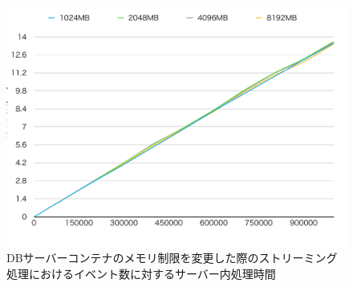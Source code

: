 \documentclass[../../../../../main]{subfiles}
\begin{document}
    \begin{figure}[H]
        \centering
        \includegraphics[width=12cm]{graph}
        \caption{DBサーバーコンテナのメモリ制限を変更した際のストリーミング処理におけるイベント数に対するサーバー内処理時間}
        \label{fig:stream-change-db-memory-limit-server-time-app_4_8192-db_400}
    \end{figure}
\end{document}
